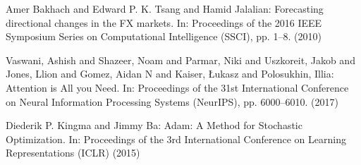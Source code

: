 \documentclass[runningheads]{llncs}
\begin{document}
%
%
%
% 
% 
%
\begin{thebibliography}{8}

Amer Bakhach and Edward P. K. Tsang and Hamid Jalalian: Forecasting directional changes in the FX markets. In: Proceedings of the 2016 IEEE Symposium Series on Computational Intelligence (SSCI), pp. 1--8. (2010)

Vaswani, Ashish and Shazeer, Noam and Parmar, Niki and Uszkoreit, Jakob and Jones, Llion and Gomez, Aidan N and Kaiser, \L ukasz and Polosukhin, Illia: Attention is All you Need. In: Proceedings of the 31st International Conference on Neural Information Processing Systems (NeurIPS), pp. 6000--6010. (2017)

Diederik P. Kingma and Jimmy Ba: Adam: A Method for Stochastic Optimization. In: Proceedings of the 3rd International Conference on Learning Representations (ICLR) (2015)


\end{thebibliography}
\end{document}

